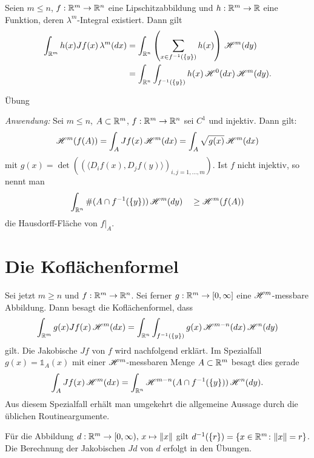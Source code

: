 \documentclass[a4paper,twoside,DIV15,BCOR12mm]{scrbook}
\newcommand{\ind}{\mathds 1}
\newcommand{\HM}{\H}
\begin{document}
\begin{korollar}
Seien $m\le n$, $f:\mathbb{R}^m\to\mathbb{R}^n$ eine Lipschitzabbildung und $h:\mathbb{R}^m\to\mathbb{R}$ eine Funktion, 
deren $\lambda^m$-Integral existiert. Dann gilt
\begin{align*}
\int_{\MdR^m}h(x)Jf(x)\, \lambda^m(dx)&=\int_{\MdR^n}\left(\sum_{x\in f^{-1}(\{y\})}h(x)\right)
\, \HM^m(dy)\\
&=\int_{\MdR^n}\int_{f^{-1}(\{y\})}h(x)\,\HM^0(dx)\, \HM^m(dy).
\end{align*}
\end{korollar}

\begin{beweis}
Übung
\end{beweis}


\emph{Anwendung:}
Sei \(m \leq n\), \(A \subset \mathbb{R}^m\), \(f: \mathbb{R}^m \to \mathbb{R}^n\) sei \(C^1\) und injektiv. Dann gilt:
\[
\HM^m(f(A)) = \int_A Jf(x) \,\HM^m(dx) = \int_A \sqrt{g(x)}\, \HM^m(dx)
\]
mit \(g(x) = \det( (\langle D_i f(x), D_j f(y) \rangle)_{i,j=1,\dots,m} )\).
Ist \(f\) nicht injektiv, so nennt man
\[
\int_{\MdR^n} \#(A \cap f^{-1}(\{y\}))\, \HM^m(dy) \quad \geq \HM^m(f(A))
\]
die Hausdorff-Fläche von  $f|_A$.


\section{Die Koflächenformel}

Sei jetzt \(m \geq n\) und \(f: \mathbb{R}^m \to \mathbb{R}^n\). Sei ferner \(g: \mathbb{R}^m \to [0,\infty]\) eine $\HM^m$-messbare 
Abbildung. Dann besagt die Koflächenformel, dass
\[
\int_{\MdR^m} g(x) Jf(x) \,\HM^m(dx) = \int_{\MdR^n} \int_{f^{-1}(\{y\})} g(x)\, \HM^{m-n}(dx) \,\HM^n(dy)
\]
gilt. Die Jakobische $Jf$ von $f$ wird nachfolgend erklärt. Im Spezialfall \(g(x) = \ind_A(x)\) mit einer $\HM^m$-messbaren Menge \(A \subset \mathbb{R}^m\) besagt dies gerade
\[
\int_A Jf(x) \,\HM^m(dx) = \int_{\MdR^n} \HM^{m-n}(A \cap f^{-1}(\{y\})) \,\HM^n(dy).
\]
Aus diesem Spezialfall erhält man umgekehrt die allgemeine Aussage durch die üblichen Routineargumente.
\begin{beispiel}
Für die Abbildung 
\(d: \mathbb{R}^m \to [0,\infty),\, x \mapsto \|x\|\) gilt \( d^{-1}(\{r\}) = \{x\in\mathbb{R}^m \colon \|x\|=r\}\). 
Die Berechnung der Jakobischen $Jd$ von $d$ erfolgt in den Übungen.
\end{beispiel}
\end{document}
